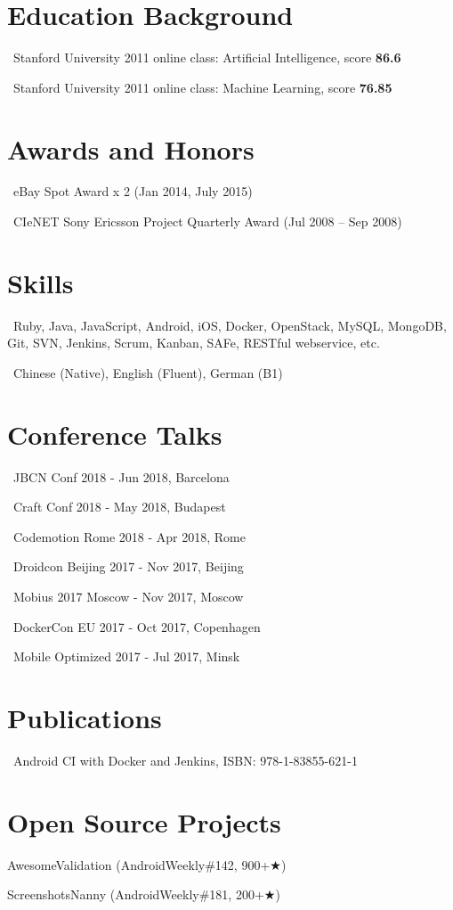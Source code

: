 \documentclass{cv}
\begin{document}
\section*{Education Background}


\faGraduationCap\ Stanford University 2011 online class: Artificial Intelligence, score \textbf{86.6}

\faGraduationCap\ Stanford University 2011 online class: Machine Learning, score \textbf{76.85}
~\\

\section*{Awards and Honors}

\faTrophy\ eBay Spot Award x 2 (Jan 2014, July 2015)

\faTrophy\ CIeNET Sony Ericsson Project Quarterly Award (Jul 2008 – Sep 2008)
~\\

\section*{Skills}

\faCode\ Ruby, Java, JavaScript, Android, iOS, Docker, OpenStack, MySQL, MongoDB, Git, SVN, Jenkins, Scrum, Kanban, SAFe, RESTful webservice, etc.

\faLanguage\ Chinese (Native), English (Fluent), German (B1)
~\\

\section*{Conference Talks}

\faMicrophone\ JBCN Conf 2018 - Jun 2018, Barcelona

\faMicrophone\ Craft Conf 2018 - May 2018, Budapest

\faMicrophone\ Codemotion Rome 2018 - Apr 2018, Rome

\faMicrophone\ Droidcon Beijing 2017 - Nov 2017, Beijing

\faMicrophone\ Mobius 2017 Moscow - Nov 2017, Moscow

\faMicrophone\ DockerCon EU 2017 - Oct 2017, Copenhagen

\faMicrophone\ Mobile Optimized 2017 - Jul 2017, Minsk
~\\

\section*{Publications}

\faBook\ Android CI with Docker and Jenkins, ISBN: 978-1-83855-621-1
~\\

\section*{Open Source Projects}

AwesomeValidation (AndroidWeekly\#142, 900+{\DejaVuSans ★})

ScreenshotsNanny (AndroidWeekly\#181, 200+{\DejaVuSans ★})
\end{document}
